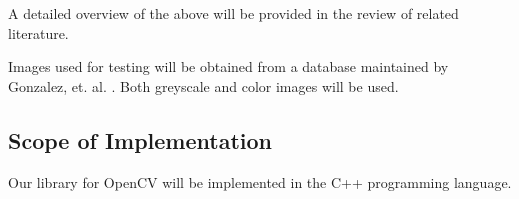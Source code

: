 A detailed overview of the above will be provided in the review of related literature.

Images used for testing will be obtained from a database maintained by Gonzalez, et. al. \cite{gonzalez_image_nodate}. Both greyscale and color images will be used.

\subsection{Scope of Implementation}
Our library for OpenCV will be implemented in the C++ programming language.
